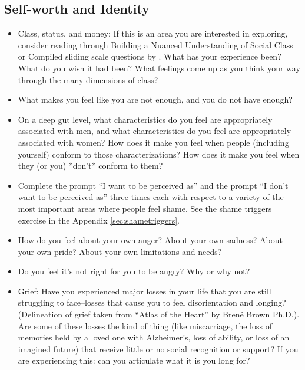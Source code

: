 \documentclass[12pt,letterpaper]{book}
\begin{document}
\subsection*{Self-worth and Identity}
\begin{itemize}
    \item Class, status, and money: If this is an area you are interested in exploring, consider reading through Building a Nuanced Understanding of Social Class or Compiled sliding scale questions by \textcite{harperClass} . What has your experience been? What do you wish it had been? What feelings come up as you think your way through the many dimensions of class?
    \item  What makes you feel like you are not enough, and you do not have enough?
    \item  On a deep gut level, what characteristics do you feel are appropriately associated with men, and what characteristics do you feel are appropriately associated with women? How does it make you feel when people (including yourself) conform to those characterizations? How does it make you feel when they (or you) *don't* conform to them?
    \item  Complete the prompt “I want to be perceived as” and the prompt “I don't want to be perceived as” three times each with respect to a variety of the most important areas where people feel shame. See the shame triggers exercise in the Appendix \ref{sec:shametriggers}.
    \item  How do you feel about your own anger? About your own sadness? About your own pride? About your own limitations and needs?
    \item  Do you feel it's not right for you to be angry? Why or why not?
    \item  Grief: Have you experienced major losses in your life that you are still struggling to face–losses that cause you to feel disorientation and longing? (Delineation of grief taken from “Atlas of the Heart” by Brené Brown Ph.D.). Are some of these losses the kind of thing (like miscarriage, the loss of memories held by a loved one with Alzheimer's, loss of ability, or loss of an imagined future) that receive little or no social recognition or support? If you are experiencing this: can you articulate what it is you long for?
\end{itemize}
\end{document}
